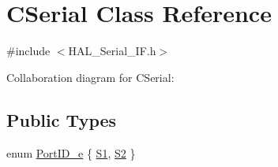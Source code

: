 \hypertarget{class_c_serial}{}\section{C\+Serial Class Reference}
\label{class_c_serial}


{\ttfamily \#include $<$H\+A\+L\+\_\+\+Serial\+\_\+\+I\+F.\+h$>$}



Collaboration diagram for C\+Serial\+:
\subsection*{Public Types}
\begin{DoxyCompactItemize}
\item 
enum \mbox{\hyperlink{class_c_serial_a000039540cc90b18bafacf5744e7eda2}{Port\+I\+D\+\_\+e}} \{ \mbox{\hyperlink{class_c_serial_a000039540cc90b18bafacf5744e7eda2a2a245d3c55e5b6e7052daf261924ce08}{S1}}, 
\mbox{\hyperlink{class_c_serial_a000039540cc90b18bafacf5744e7eda2a8cc95f4591147b0df028e003f82220a1}{S2}}
 \}
\end{DoxyCompactItemize}

